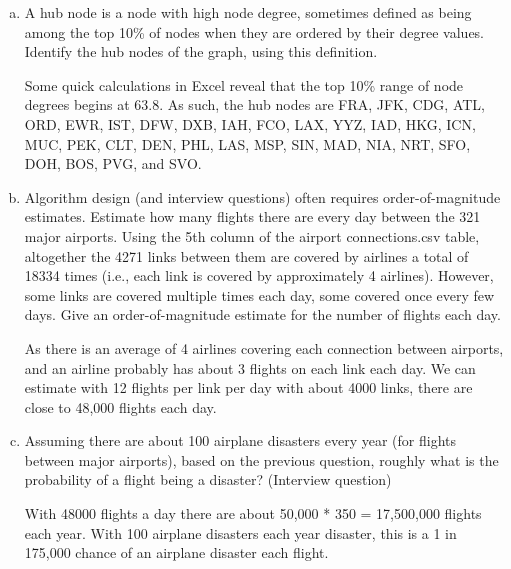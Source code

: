 \documentclass[12pt]{article}
\begin{document}
\begin{enumerate}[(a)]
plotting the histogram for $P(d)$ and visually determining if $\log{P(d)}$ appears to be a linear function of d. \\
\begin{addmargin}[2em]{2em}
The histogram for $P(d)$ is as follows: \\
 \\ 
The graph can be considered a scale-free graph, as the $\log{P(d)}$ appears visually to be a linear function of $d$.
\end{addmargin}
\item A hub node is a node with high node degree, sometimes defined as being among the top 10\% of nodes when they are ordered by their degree values. Identify the hub nodes of the graph, using this definition.
\begin{addmargin}[2em]{2em}
Some quick calculations in Excel reveal that the top 10\% range of node degrees begins at 63.8. As such, the hub nodes are FRA, JFK, CDG, ATL, ORD, EWR, IST, DFW, DXB, IAH, FCO, LAX, YYZ, IAD, HKG, ICN, MUC, PEK, CLT, DEN, PHL, LAS, MSP, SIN, MAD, NIA, NRT, SFO, DOH, BOS, PVG, and SVO.
\end{addmargin}
\item  Algorithm design (and interview questions) often requires order-of-magnitude estimates. Estimate how many flights there are every day between the 321 major airports. Using the 5th column of the airport connections.csv
table, altogether the 4271 links between them are covered by airlines a total of 18334 times (i.e., each link is covered by approximately 4 airlines). However, some links are covered multiple times each day, some covered once every few days. Give an order-of-magnitude estimate for the number of flights each day.
\begin{addmargin}[2em]{2em}
As there is an average of 4 airlines covering each connection between airports, and an airline probably has about 3 flights on each link each day. We can estimate with 12 flights per link per day with about 4000 links, there are close to 48,000 flights each day.
\end{addmargin}
\item  Assuming there are about 100 airplane disasters every year (for flights between major airports), based on the previous question, roughly what is the probability of a flight being a disaster? (Interview question)
\begin{addmargin}[2em]{2em}
With 48000 flights a day there are about 50,000 * 350 = 17,500,000 flights each year. With 100 airplane disasters each year disaster, this is a 1 in 175,000 chance of an airplane disaster each flight.
\end{addmargin}
\end{enumerate}
\end{document}
